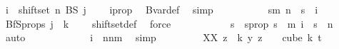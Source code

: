 \begin{isabellebody}
\ {\isachardoublequoteopen}i\ {\isasymin}\ shiftset\ n\ {\isacharparenleft}{\kern0pt}BS\ {\isacharparenleft}{\kern0pt}j\ {\isacharminus}{\kern0pt}\ {}{\isacharparenright}{\kern0pt}{\isacharparenright}{\kern0pt}{\isachardoublequoteclose}\ \isamarkupfalse%
\ i{\isacharunderscore}{\kern0pt}prop\ \isamarkupfalse%
\ Bvar{\isacharunderscore}{\kern0pt}def\ \isamarkupfalse%
\ simp\isanewline
\ \ \ \ \ \ \ \isamarkupfalse%
\ \isamarkupfalse%
\ {\isachardoublequoteopen}{\isasymexists}s{\isacharless}{\kern0pt}m{\isachardot}{\kern0pt}\ n\ {\isacharplus}{\kern0pt}\ s\ {\isacharequal}{\kern0pt}\ i{\isachardoublequoteclose}\ \isamarkupfalse%
\ BfS{\isacharunderscore}{\kern0pt}props{\isacharparenleft}{\kern0pt}{}{\isacharparenright}{\kern0pt}\ {\isacartoucheopen}j\ {\isacharless}{\kern0pt}\ k\ {\isacharplus}{\kern0pt}\ {}{\isacartoucheclose}\ \isamarkupfalse%
\ shiftset{\isacharunderscore}{\kern0pt}def\ \isamarkupfalse%
\ force\ \isanewline
\ \ \ \ \ \ \ \isamarkupfalse%
\ \isamarkupfalse%
\ s\ \ s{\isacharunderscore}{\kern0pt}prop{\isacharcolon}{\kern0pt}\ {\isachardoublequoteopen}s\ {\isacharless}{\kern0pt}\ m{\isachardoublequoteclose}\ {\isachardoublequoteopen}i\ {\isacharequal}{\kern0pt}\ s\ {\isacharplus}{\kern0pt}\ n{\isachardoublequoteclose}\ \isamarkupfalse%
\ auto\isanewline
\ \ \ \ \ \ \ \isamarkupfalse%
\ \isamarkupfalse%
\ {\isacharasterisk}{\kern0pt}{\isacharcolon}{\kern0pt}\ {\isachardoublequoteopen}\ i\ {\isasymin}\ {\isacharbraceleft}{\kern0pt}n{\isachardot}{\kern0pt}{\isachardot}{\kern0pt}{\isacharless}{\kern0pt}n{\isacharplus}{\kern0pt}m{\isacharbraceright}{\kern0pt}{\isachardoublequoteclose}\ \isamarkupfalse%
\ simp\isanewline
\isanewline
\ \ \ \ \ \ \ \isamarkupfalse%
\ XX{\isacharcolon}{\kern0pt}\ {\isachardoublequoteopen}{\isacharparenleft}{\kern0pt}{\isasymlambda}z\ {\isasymin}\ {\isacharbraceleft}{\kern0pt}{\isachardot}{\kern0pt}{\isachardot}{\kern0pt}{\isacharless}{\kern0pt}k{\isacharbraceright}{\kern0pt}{\isachardot}{\kern0pt}\ y\ {\isacharparenleft}{\kern0pt}z\ {\isacharplus}{\kern0pt}\ {}{\isacharparenright}{\kern0pt}{\isacharparenright}{\kern0pt}\ {\isasymin}\ cube\ k\ {\isacharparenleft}{\kern0pt}t{\isacharplus}{\kern0pt}{}{\isacharparenright}{\kern0pt}{\isachardoublequoteclose}\ \isamarkupfalse%

\end{isabellebody}
